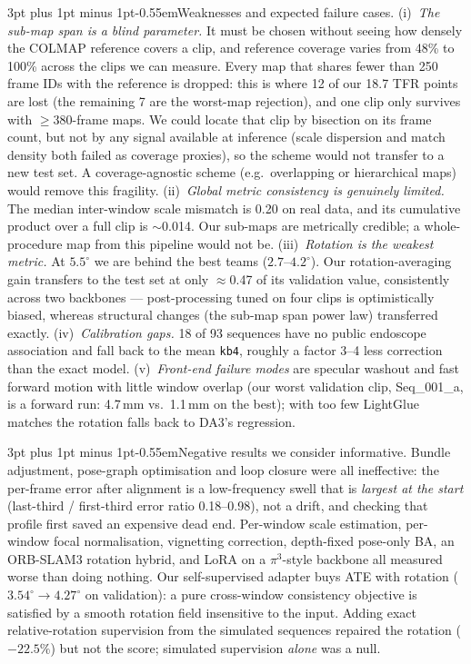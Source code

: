 \documentclass[10pt,a4paper]{article}
\makeatletter
\renewcommand\paragraph{\@startsection{paragraph}{4}{\z@}%
  {3pt plus 1pt minus 1pt}{-0.55em}{\normalfont\bfseries}}
\makeatother
\begin{document}
\paragraph{Weaknesses and expected failure cases.}
(i)~\emph{The sub-map span is a blind parameter.} It must be chosen without seeing how densely the
COLMAP reference covers a clip, and reference coverage varies from 48\% to 100\% across the clips we
can measure. Every map that shares fewer than 250 frame IDs with the reference is dropped: this is
where 12 of our 18.7 TFR points are lost (the remaining 7 are the worst-map rejection), and one clip
only survives with $\geq$380-frame maps. We could
locate that clip by bisection on its frame count, but not by any signal available at inference
(scale dispersion and match density both failed as coverage proxies), so the scheme would not
transfer to a new test set. A coverage-agnostic scheme (e.g.\ overlapping or
hierarchical maps) would remove this fragility.
(ii)~\emph{Global metric consistency is genuinely limited.} The median inter-window scale mismatch is
0.20 on real data, and its cumulative product over a full clip is $\sim$0.014. Our sub-maps are
metrically credible; a whole-procedure map from this pipeline would not be.
(iii)~\emph{Rotation is the weakest metric.} At $5.5^\circ$ we are behind the best teams
($2.7$--$4.2^\circ$). Our rotation-averaging gain transfers to the test set at only $\approx$0.47 of
its validation value, consistently across two backbones --- post-processing tuned on four clips is
optimistically biased, whereas structural changes (the sub-map span power law) transferred exactly.
(iv)~\emph{Calibration gaps.} 18 of 93 sequences have no public endoscope association and fall back
to the mean \texttt{kb4}, roughly a factor 3--4 less correction than the exact model.
(v)~\emph{Front-end failure modes} are specular washout and fast forward motion with little window
overlap (our worst validation clip, Seq\_001\_a, is a forward run: 4.7\,mm vs.\ 1.1\,mm on the best);
with too few LightGlue matches the rotation falls back to DA3's regression.

\paragraph{Negative results we consider informative.}
Bundle adjustment, pose-graph optimisation and loop closure were all ineffective: the per-frame
error after alignment is a low-frequency swell that is \emph{largest at the start} (last-third /
first-third error ratio 0.18--0.98), not a drift, and checking that profile first saved an expensive
dead end. Per-window scale estimation, per-window focal normalisation, vignetting correction,
depth-fixed pose-only BA, an ORB-SLAM3 rotation hybrid, and LoRA on a $\pi^3$-style backbone all
measured worse than doing nothing. Our self-supervised adapter buys ATE with rotation
($3.54^\circ\to4.27^\circ$ on validation): a pure cross-window consistency objective is satisfied by
a smooth rotation field insensitive to the input. Adding exact relative-rotation supervision from
the simulated sequences repaired the rotation ($-22.5\%$) but not the score; simulated supervision
\emph{alone} was a null.

{\small


}
\end{document}
